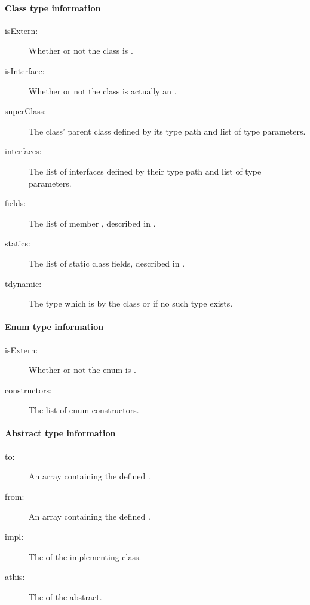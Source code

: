 \paragraph{Class type information}
\label{cr-rtti-class-type-information}

\begin{description}
    \item[isExtern:] Whether or not the class is .
    \item[isInterface:] Whether or not the class is actually an .
    \item[superClass:] The class' parent class defined by its type path and list of type parameters.
    \item[interfaces:] The list of interfaces defined by their type path and list of type parameters.
    \item[fields:] The list of member , described in .
    \item[statics:] The list of static class fields, described in .
    \item[tdynamic:] The type which is  by the class or  if no such type exists.
\end{description}

\paragraph{Enum type information}

\begin{description}
    \item[isExtern:] Whether or not the enum is .
    \item[constructors:] The list of enum constructors.
\end{description}

\paragraph{Abstract type information}

\begin{description}
    \item[to:] An array containing the defined .
    \item[from:] An array containing the defined .
    \item[impl:] The  of the implementing class.
    \item[athis:] The  of the abstract.
\end{description}
    
